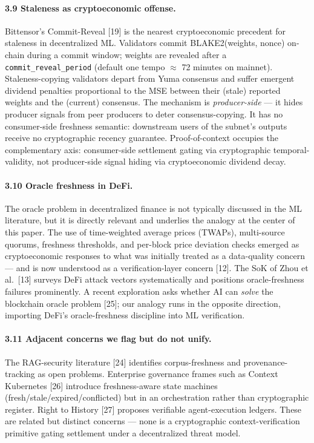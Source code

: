 \documentclass[11pt]{article}
\begin{document}
\paragraph{3.9 Staleness as cryptoeconomic offense.} Bittensor's Commit-Reveal [19] is the nearest cryptoeconomic precedent for staleness in decentralized ML. Validators commit BLAKE2(weights, nonce) on-chain during a commit window; weights are revealed after a \texttt{commit\_reveal\_period} (default one tempo $\approx$ 72 minutes on mainnet). Staleness-copying validators depart from Yuma consensus and suffer emergent dividend penalties proportional to the MSE between their (stale) reported weights and the (current) consensus. The mechanism is \emph{producer-side} --- it hides producer signals from peer producers to deter consensus-copying. It has no consumer-side freshness semantic: downstream users of the subnet's outputs receive no cryptographic recency guarantee. Proof-of-context occupies the complementary axis: consumer-side settlement gating via cryptographic temporal-validity, not producer-side signal hiding via cryptoeconomic dividend decay.

\paragraph{3.10 Oracle freshness in DeFi.} The oracle problem in decentralized finance is not typically discussed in the ML literature, but it is directly relevant and underlies the analogy at the center of this paper. The use of time-weighted average prices (TWAPs), multi-source quorums, freshness thresholds, and per-block price deviation checks emerged as cryptoeconomic responses to what was initially treated as a data-quality concern --- and is now understood as a verification-layer concern [12]. The SoK of Zhou et al.\ [13] surveys DeFi attack vectors systematically and positions oracle-freshness failures prominently. A recent exploration asks whether AI can \emph{solve} the blockchain oracle problem [25]; our analogy runs in the opposite direction, importing DeFi's oracle-freshness discipline into ML verification.

\paragraph{3.11 Adjacent concerns we flag but do not unify.} The RAG-security literature [24] identifies corpus-freshness and provenance-tracking as open problems. Enterprise governance frames such as Context Kubernetes [26] introduce freshness-aware state machines (fresh/stale/expired/conflicted) but in an orchestration rather than cryptographic register. Right to History [27] proposes verifiable agent-execution ledgers. These are related but distinct concerns --- none is a cryptographic context-verification primitive gating settlement under a decentralized threat model.
\end{document}
